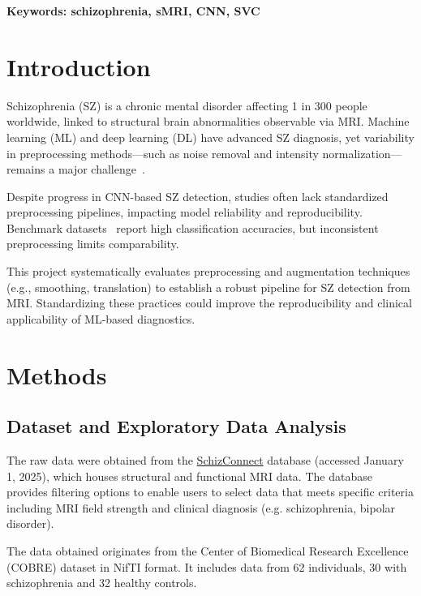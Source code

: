 \textbf{Keywords: schizophrenia, sMRI, CNN, SVC}

\section{Introduction}

Schizophrenia (SZ) is a chronic mental disorder affecting 1 in 300 people worldwide, linked to structural brain abnormalities observable via MRI. Machine learning (ML) and deep learning (DL) have advanced SZ diagnosis, yet variability in preprocessing methods—such as noise removal and intensity normalization—remains a major challenge~\cite{Benli2023, Zhang2022}.

Despite progress in CNN-based SZ detection, studies often lack standardized preprocessing pipelines, impacting model reliability and reproducibility. Benchmark datasets~\cite{Oh2020, Verma2023} report high classification accuracies, but inconsistent preprocessing limits comparability.

This project systematically evaluates preprocessing and augmentation techniques (e.g., smoothing, translation) to establish a robust pipeline for SZ detection from MRI. Standardizing these practices could improve the reproducibility and clinical applicability of ML-based diagnostics.

\section{Methods}

\subsection{Dataset and Exploratory Data Analysis}

The raw data were obtained from the \href{http://schizconnect.org}{SchizConnect} database (accessed January 1, 2025), which houses structural and functional MRI data. The database provides filtering options to enable users to select data that meets specific criteria including MRI field strength and clinical diagnosis (e.g. schizophrenia, bipolar disorder).

The data obtained originates from the Center of Biomedical Research Excellence (COBRE) dataset in NifTI format. It includes data from 62 individuals, 30 with schizophrenia and 32 healthy controls.

